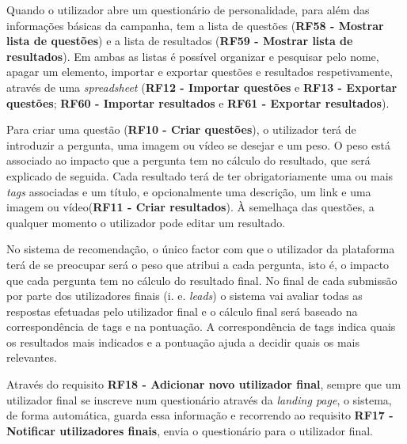 Quando o utilizador abre um questionário de personalidade, para além das informações básicas da campanha, tem a lista de questões (\textbf{RF58 - Mostrar lista de questões}) e a lista de resultados (\textbf{RF59 - Mostrar lista de resultados}). Em ambas as listas é possível organizar e pesquisar pelo nome, apagar um elemento, importar e exportar questões e resultados respetivamente, através de uma \textit{spreadsheet} (\textbf{RF12 - Importar questões} e \textbf{RF13 - Exportar questões}; \textbf{RF60 - Importar resultados} e \textbf{RF61 - Exportar resultados}).

Para criar uma questão (\textbf{RF10 - Criar questões}), o utilizador terá de introduzir a pergunta, uma imagem ou vídeo se desejar e um peso. O peso está associado ao impacto que a pergunta tem no cálculo do resultado, que será explicado de seguida. 
Cada resultado terá de ter obrigatoriamente uma ou mais \textit{tags} associadas e um título, e opcionalmente uma descrição, um link e uma imagem ou vídeo(\textbf{RF11 - Criar resultados}). À semelhaça das questões, a qualquer momento o utilizador pode editar um resultado.

No sistema de recomendação, o único factor com que o utilizador da plataforma terá de se preocupar será o peso que atribui a cada pergunta, isto é, o impacto que cada pergunta tem no cálculo do resultado final. No final de cada submissão por parte dos utilizadores finais (i. e. \textit{leads}) o sistema vai avaliar todas as respostas efetuadas pelo utilizador final e o cálculo final será baseado na correspondência de tags e na pontuação. A correspondência de tags indica quais os resultados mais indicados e a pontuação ajuda a decidir quais os mais relevantes.

Através do requisito \textbf{RF18 - Adicionar novo utilizador final}, sempre que um utilizador final se inscreve num questionário através da \textit{landing page}, o sistema, de forma automática, guarda essa informação e recorrendo ao requisito \textbf{RF17 - Notificar utilizadores finais}, envia o questionário para o utilizador final.

\pagebreak


